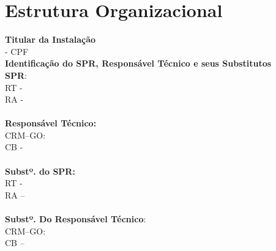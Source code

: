 \chapter{Estrutura Organizacional}
\label{ch:estrutura_organizacional}

\noindent \textbf{Titular da Instalação}\\
\titularA - CPF \titularACPF\\
 
\noindent \textbf{Identificação do SPR, Responsável Técnico e seus Substitutos}\\
\textbf{SPR}: \supervisor\\
RT - \supervisorRT\\
RA - \supervisorRA \\
\\
\textbf{Responsável Técnico:} \rt \\
CRM–GO: \rtCRM\\
CB - \rtCB \\
\\
\textbf{Substº. do SPR:} \subsSupervisor\\
RT - \subsSupervisorRT \\
RA – \subsSupervisorRA \\
\\
\textbf{Substº. Do Responsável Técnico}: \subsRt\\
CRM–GO: \subsRtCRM\\
CB – \subsRtCB

